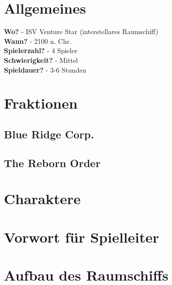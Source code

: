 
\section{Allgemeines}
\textbf{Wo?}            -  ISV Venture Star (interstellares Raumschiff) \\
\textbf{Wann?}          -  2100 n. Chr. \\
\textbf{Spielerzahl?}   -  4 Spieler \\
\textbf{Schwierigkeit?} -  Mittel \\
\textbf{Spieldauer?}    -  3-6 Stunden \\

\section{Fraktionen}

\subsection{Blue Ridge Corp.}

\subsection{The Reborn Order}

\newpage

\section{Charaktere}


\subsection{}


\subsection{}

\newpage

\section{Vorwort für Spielleiter}



\section{Aufbau des Raumschiffs}



